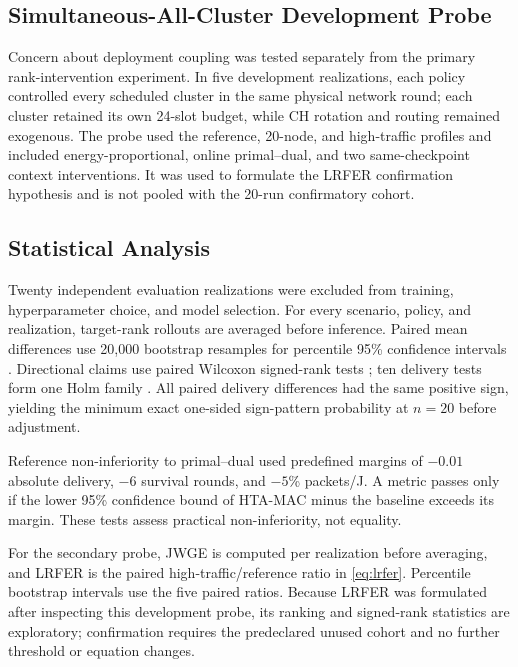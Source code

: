 \documentclass[journal]{IEEEtran}
\newcommand{\method}{HTA-MAC}
\begin{document}
\subsection{Simultaneous-All-Cluster Development Probe}

Concern about deployment coupling was tested separately from the primary
rank-intervention experiment. In five development realizations, each policy
controlled every scheduled cluster in the same physical network round; each
cluster retained its own 24-slot budget, while CH rotation and routing remained
exogenous. The probe used the reference, 20-node, and high-traffic profiles and
included energy-proportional, online primal--dual, and two same-checkpoint
context interventions. It was used to formulate the LRFER confirmation
hypothesis and is not pooled with the 20-run confirmatory cohort.

\subsection{Statistical Analysis}

Twenty independent evaluation realizations were excluded from training,
hyperparameter choice, and model selection. For every scenario, policy, and
realization, target-rank rollouts are averaged before inference.
Paired mean differences use 20,000 bootstrap resamples for percentile 95\%
confidence intervals \cite{efron1994bootstrap}. Directional claims use paired
Wilcoxon signed-rank tests \cite{wilcoxon1945}; ten delivery tests form one Holm
family \cite{holm1979}. All paired delivery differences had the same positive
sign, yielding the minimum exact one-sided sign-pattern probability at
$n=20$ before adjustment.

Reference non-inferiority to primal--dual used predefined margins of $-0.01$ absolute
delivery, $-6$ survival rounds, and $-5$\% packets/J. A metric passes only if
the lower 95\% confidence bound of \method{} minus the baseline exceeds its
margin. These tests assess practical non-inferiority, not equality.

For the secondary probe, JWGE is computed per realization before averaging,
and LRFER is the paired high-traffic/reference ratio in
\eqref{eq:lrfer}. Percentile bootstrap intervals use the five paired ratios.
Because LRFER was formulated after inspecting this development probe, its
ranking and signed-rank statistics are exploratory; confirmation requires the
predeclared unused cohort and no further threshold or equation changes.
\end{document}
